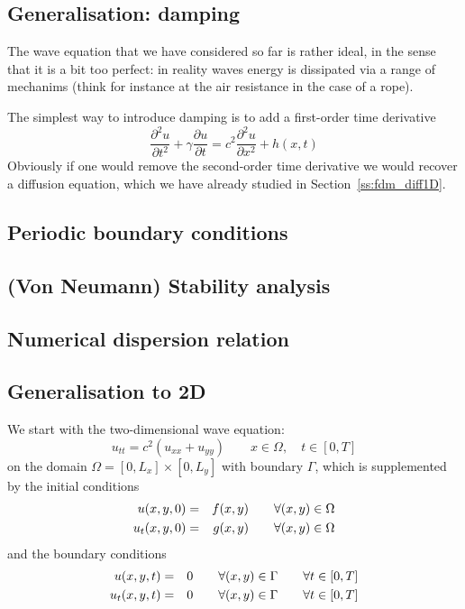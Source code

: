 \subsection{Generalisation: damping}

The wave equation that we have considered so far is rather ideal, 
in the sense that it is a bit too perfect: in reality waves 
energy is dissipated via a range of mechanims (think for instance 
at the air resistance in the case of a rope).

The simplest way to introduce damping is to add a first-order time
derivative
\[
\frac{\partial^2 u}{\partial t^2} 
+ \gamma \frac{\partial u}{\partial t} 
=
c^2 \frac{\partial^2 u}{\partial x^2} + h(x,t)
\]
Obviously if one would remove the second-order 
time derivative we would recover a diffusion equation, 
which we have already studied in Section~\ref{ss:fdm_diff1D}.


\subsection{Periodic boundary conditions}

\subsection{(Von Neumann) Stability analysis}

\subsection{Numerical dispersion relation}

\subsection{Generalisation to 2D}


We start with the two-dimensional wave equation:
\[
u_{tt}=c^2 (u_{xx} +u_{yy}) \qquad x\in\Omega, \quad t\in[0,T]
\]
on the domain $\Omega=[0,L_x]\times[0,L_y]$ with boundary $\Gamma$,
which is supplemented by the initial conditions
\begin{eqnarray}
u(x,y,0) &=& f(x,y)   \qquad  \forall (x,y)\in \Omega\nonumber\\
u_t(x,y,0) &=& g(x,y) \qquad  \forall (x,y)\in \Omega
\end{eqnarray}
and the boundary conditions
\begin{eqnarray}
u(x,y,t) &=& 0 \qquad \forall (x,y)\in \Gamma \qquad \forall t \in [0,T] \nonumber\\
u_t(x,y,t) &=& 0 \qquad \forall (x,y)\in \Gamma \qquad \forall t \in [0,T] 
\label{eq:fdm_wave_bc}
\end{eqnarray}


